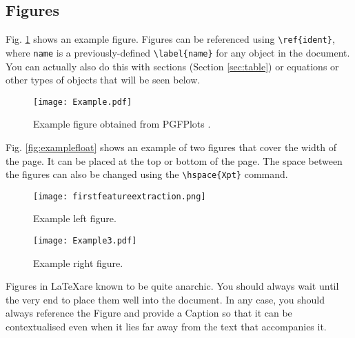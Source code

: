 \documentclass[9pt,a4paper,twoside]{tau-class/tau}
\begin{document}
    \subsection{Figures}
		
	Fig. \ref{fig:figure} shows an example figure. Figures can be referenced using \verb|\ref{ident}|, where \texttt{name} is a previously-defined \verb|\label{name}| for any object in the document. You can actually also do this with sections (Section \ref{sec:table}) or equations or other types of objects that will be seen below.
		
	\begin{figure}[H]
		\centering
		\texttt{[image: Example.pdf]}
		\caption{Example figure obtained from PGFPlots \cite{PFGPlots}.}
		\label{fig:figure}
	\end{figure}
		
        Fig. \ref{fig:examplefloat} shows an example of two figures that cover the width of the page. It can be placed at the top or bottom of the page. The space between the figures can also be changed using the \verb|\hspace{Xpt}| command.
		
        \begin{figure*}[tp] %
		\centering
		  \begin{subfigure}[b]{0.38\linewidth} %
			\texttt{[image: firstfeatureextraction.png]}
			\caption{Example left figure.}
			\label{fig:figa}
		\end{subfigure}
			\hspace{20pt}   %
		\begin{subfigure}[b]{0.375\linewidth} %
			\texttt{[image: Example3.pdf]}
			\caption{Example right figure.}
			\label{fig:figb}
		\end{subfigure}
		\caption{Example figure that covers the width of the page obtained from PGFPlots \cite{PFGPlots}.}
		\label{fig:examplefloat}
	\end{figure*}

    \begin{info}
    	Figures in \LaTeX are known to be quite anarchic. You should always wait until the very end to place them well into the document. In any case, you should always reference the Figure and provide a Caption so that it can be contextualised even when it lies far away from the text that accompanies it.
    \end{info}
\end{document}
